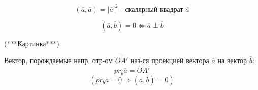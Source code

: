 \begin{symb}
\[
    (\overline{a}, \overline{a}) = |\overline{a}|^{2} \text{ - скалярный квадрат $\overline{a}$}
\] 
\end{symb}
\begin{note}
    \[
        (\overline{a}, \overline{b}) = 0 \iff \overline{a} \perp \overline{b}
    \] 
\end{note}
\begin{definition}
    (***Картинка***)

    Вектор, порождаемые напр. отр-ом $\overline{OA'}$ наз-ся проекцией вектора $\overline{a}$ на вектор $\overline{b}$:
    \[
    pr_{\overline{b}}\overline{a} = \overline{OA'}
    \] 
    \[
        (pr_{\overline{b}}\overline{a} = 0 \Rightarrow (\overline{a}, \overline{b}) = 0)
    \] 
\end{definition}

